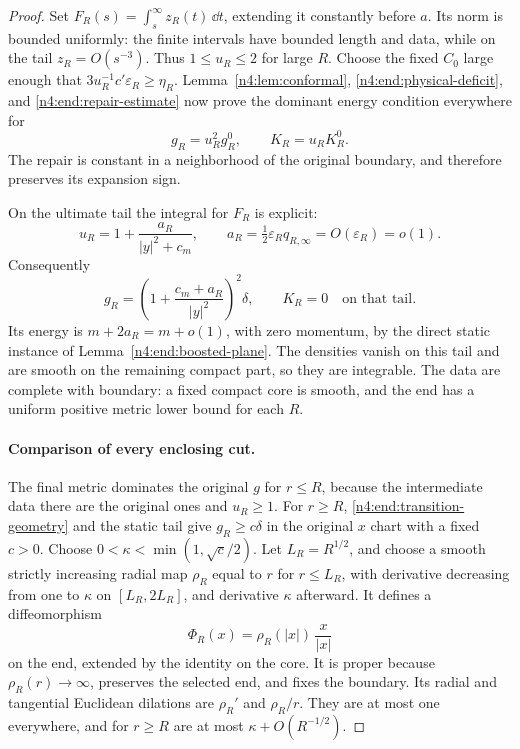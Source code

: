 \begin{proof}
Set \(F_R(s)=\int_s^\infty z_R(t)\,\dd t\), extending it constantly
before \(a\). Its norm is bounded uniformly: the finite intervals have
bounded length and data, while on the tail \(z_R=O(s^{-3})\).
Thus \(1\le u_R\le2\) for large \(R\).
Choose the fixed \(C_0\) large enough that
\(3u_R^{-1}c'\varepsilon_R\ge\eta_R\). Lemma~\ref{n4:lem:conformal},
\eqref{n4:end:physical-deficit}, and \eqref{n4:end:repair-estimate} now prove
the dominant energy condition everywhere for
\[
 g_R=u_R^2g_R^0,\qquad K_R=u_RK_R^0.
\]
The repair is constant in a neighborhood of the original boundary, and
therefore preserves its expansion sign.

On the ultimate tail the integral for \(F_R\) is explicit:
\[
 u_R=1+\frac{a_R}{|y|^2+c_m},\qquad
 a_R=\tfrac12\varepsilon_Rq_{R,\infty}=O(\varepsilon_R)=o(1).
\]
Consequently
\begin{equation}\label{n4:end:static-repaired-metric}
 g_R=\left(1+\frac{c_m+a_R}{|y|^2}\right)^2\delta,
 \qquad K_R=0
 \quad\text{on that tail}.
\end{equation}
Its energy is \(m+2a_R=m+o(1)\), with zero momentum, by the direct
static instance of Lemma~\ref{n4:end:boosted-plane}. The densities vanish
on this tail and are smooth on the remaining compact part, so they are
integrable. The data are complete with boundary: a fixed compact core
is smooth, and the end has a uniform positive metric lower bound for
each \(R\).

\paragraph{Comparison of every enclosing cut.}
The final metric dominates the original \(g\) for \(r\le R\), because
the intermediate data there are the original ones and \(u_R\ge1\).
For \(r\ge R\), \eqref{n4:end:transition-geometry} and the static tail
give \(g_R\ge c\delta\) in the original \(x\) chart with a fixed
\(c>0\). Choose \(0<\kappa<\min(1,\sqrt c/2)\).
Let \(L_R=R^{1/2}\), and choose a smooth strictly increasing radial map
\(\rho_R\) equal to \(r\) for \(r\le L_R\), with derivative decreasing
from one to \(\kappa\) on \([L_R,2L_R]\), and derivative \(\kappa\)
afterward. It defines a diffeomorphism
\[
 \Phi_R(x)=\rho_R(|x|)\,\frac{x}{|x|}
\]
on the end, extended by the identity on the core. It is proper because
\(\rho_R(r)\to\infty\), preserves the selected end, and fixes the
boundary. Its radial and tangential Euclidean dilations are
\(\rho_R'\) and \(\rho_R/r\). They are at most one everywhere, and
for \(r\ge R\) are at most \(\kappa+O(R^{-1/2})\).


\end{proof}

